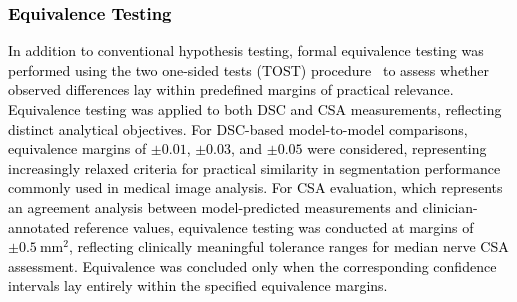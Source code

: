 \textcolor{black}{\subsubsection{Equivalence Testing}}
\noindent
\textcolor{black}{In addition to conventional hypothesis testing, formal equivalence testing was performed using the two one-sided tests (TOST) procedure~\cite{schuirmann1987comparison} to assess whether observed differences lay within predefined margins of practical relevance. Equivalence testing was applied to both DSC and CSA measurements, reflecting distinct analytical objectives. For DSC-based model-to-model comparisons, equivalence margins of $\pm 0.01$, $\pm 0.03$, and $\pm 0.05$ were considered, representing increasingly relaxed criteria for practical similarity in segmentation performance commonly used in medical image analysis. For CSA evaluation, which represents an agreement analysis between model-predicted measurements and clinician-annotated reference values, equivalence testing was conducted at margins of  $\pm 0.5~\mathrm{mm}^2$, reflecting clinically meaningful tolerance ranges for median nerve CSA assessment. Equivalence was concluded only when the corresponding confidence intervals lay entirely within the specified equivalence margins.}

